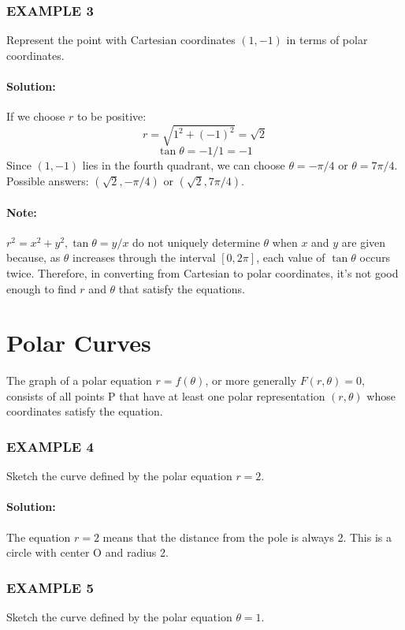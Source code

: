 \documentclass{article}
\begin{document}
\subsubsection*{EXAMPLE 3}
Represent the point with Cartesian coordinates $(1,-1)$ in terms of polar coordinates.

\paragraph{Solution:} If we choose $r$ to be positive:
\[ r = \sqrt{1^2 + (-1)^2} = \sqrt{2} \]
\[ \tan\theta = -1/1 = -1 \]
Since $(1,-1)$ lies in the fourth quadrant, we can choose $\theta = -\pi/4$ or $\theta = 7\pi/4$. Possible answers: $(\sqrt{2}, -\pi/4)$ or $(\sqrt{2}, 7\pi/4)$.

\paragraph{Note:} $r^2 = x^2 + y^2, \tan\theta = y/x$ do not uniquely determine $\theta$ when $x$ and $y$ are given because, as $\theta$ increases through the interval $[0, 2\pi]$, each value of $\tan\theta$ occurs twice. Therefore, in converting from Cartesian to polar coordinates, it’s not good enough to find $r$ and $\theta$ that satisfy the equations.

\section*{Polar Curves}
The graph of a polar equation $r=f(\theta)$, or more generally $F(r,\theta)=0$, consists of all points P that have at least one polar representation $(r,\theta)$ whose coordinates satisfy the equation.

\subsubsection*{EXAMPLE 4}
Sketch the curve defined by the polar equation $r=2$.

\paragraph{Solution:} The equation $r=2$ means that the distance from the pole is always 2. This is a circle with center O and radius 2.

\subsubsection*{EXAMPLE 5}
Sketch the curve defined by the polar equation $\theta=1$.
\end{document}
